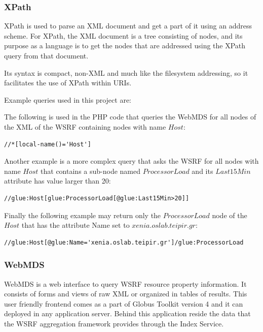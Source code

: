 \subsubsection{XPath}

XPath is used to parse an XML document and get a part of it using an address scheme. For XPath, the XML document is a tree consisting of nodes, and its purpose as a language is to get the nodes that are addressed using the XPath query from that document.

Its syntax is compact, non-XML and much like the filesystem addressing, so it facilitates the use of XPath within URIs.

Example queries used in this project are:

The following is used in the PHP code that queries the WebMDS for all nodes of the XML of the WSRF containing nodes with name $Host$:
\begin{verbatim}
//*[local-name()='Host']
\end{verbatim}

Another example is a more complex query that asks the WSRF for all nodes with name $Host$ that contains a sub-node named $ProcessorLoad$ and its $Last15Min$ attribute has value larger than 20:
\begin{verbatim}
//glue:Host[glue:ProcessorLoad[@glue:Last15Min>20]]
\end{verbatim}

Finally the following example may return only the $ProcessorLoad$ node of the $Host$ that has the attribute Name set to $xenia.oslab.teipir.gr$:
\begin{verbatim}
//glue:Host[@glue:Name='xenia.oslab.teipir.gr']/glue:ProcessorLoad
\end{verbatim}


\subsubsection{WebMDS}

WebMDS is a web interface to query WSRF resource property information. It consists of forms and views of raw XML or organized in tables of results. This user friendly frontend comes as a part of Globus Toolkit version 4 and it can deployed in any application server. Behind this application reside the data that the WSRF aggregation framework provides through the Index Service.

